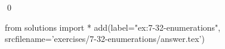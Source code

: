 
\begin{ex}
  \label{ex:7-32-enumerations}
  
  \qed
\end{ex}
\begin{python0}
from solutions import *
add(label="ex:7-32-enumerations",
    srcfilename='exercises/7-32-enumerations/answer.tex')
\end{python0}
